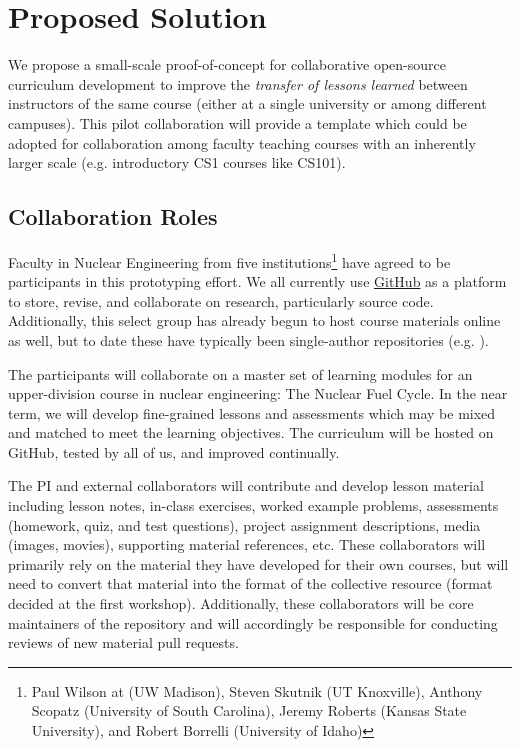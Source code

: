 \documentclass[11pt]{article}
\begin{document}
          \section{Proposed Solution}
          We propose a small-scale proof-of-concept for collaborative
          open-source curriculum development to improve the \emph{transfer of lessons 
          learned} between instructors of the same course (either at a single 
          university or among different campuses). This pilot collaboration 
          will provide a template which could be adopted for collaboration 
          among faculty teaching courses with an inherently larger scale (e.g. 
          introductory CS1 courses like CS101).

          \subsection{Collaboration Roles}
          Faculty in Nuclear Engineering from five institutions\footnote{
          Paul Wilson at (UW Madison), 
          Steven Skutnik (UT Knoxville), 
          Anthony Scopatz (University of South Carolina), 
          Jeremy Roberts (Kansas State University), 
          and Robert Borrelli (University of Idaho)
          } have agreed to be participants in 
          this prototyping effort. We all currently use 
          \href{https://github.com}{GitHub} as a platform to store, 
          revise, and collaborate on research, particularly source code. 
          Additionally, this select group has already begun to host course 
          materials online as well, but to date these have typically been single-author 
          repositories (e.g. \cite{huff_npre412_2017}).

          The participants will collaborate on a master set of learning 
          modules for an upper-division course in nuclear engineering: 
          The Nuclear Fuel Cycle. In the near term, we will develop 
          fine-grained lessons and assessments which may be mixed and matched 
          to meet the learning objectives. The curriculum will be hosted on 
          GitHub, tested by all of us, and improved continually.
          
          The PI and external collaborators will contribute and develop lesson 
          material including lesson notes, in-class exercises, worked example 
          problems, assessments (homework, quiz, and test questions), project 
          assignment descriptions, media (images, movies), supporting material 
          references, etc. These collaborators will primarily rely on the 
          material they have developed for their own courses, but will need to 
          convert that material into the format of the collective resource 
          (format decided at the first workshop). Additionally, these 
          collaborators will be core maintainers of the repository and will 
          accordingly be responsible for conducting reviews of new material 
          pull requests.
\end{document}
